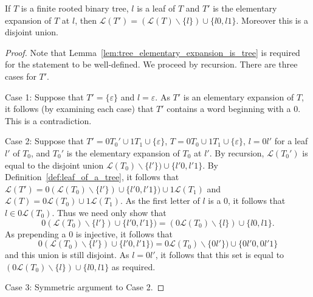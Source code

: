 \begin{lemma}\label{lem:leaves_of_elementary_expanion}
    If \(T\) is a finite rooted binary tree, \(l\) is a leaf of \(T\) and \(T'\) is the elementary expansion of \(T\) at \(l\), then \(\mathcal{L}(T')=(\mathcal{L}(T)\backslash \{l\})\cup \{l0,l1\}\). Moreover this is a disjoint union.
 \end{lemma}
 \begin{proof}
 Note that Lemma~\ref{lem:tree_elementary_expansion_is_tree} is required for the statement to be well-defined.
 We proceed by recursion.
     There are three cases for \(T'\).

     Case 1: Suppose that \(T'= \{\varepsilon\}\) and \(l=\varepsilon\). As \(T'\) is an elementary expansion of \(T\), it follows (by examining each case) that \(T'\) contains a word beginning with a \(0\). This is a contradiction.

     Case 2: Suppose that \(T'= 0T_0'\cup 1 T_1 \cup \{\varepsilon\}\), \(T=0T_0 \cup 1T_1 \cup \{\varepsilon\}\), \(l=0l'\) for a leaf \(l'\) of \(T_0\), and \(T_0'\) is the elementary expansion of \(T_0\) at \(l'\).  By recursion, \(\mathcal{L}(T_0')\) is equal to the disjoint union \(\mathcal{L}(T_0)\backslash \{l'\})\cup \{l'0,l'1\}\). By Definition~\ref{def:leaf_of_a_tree}, it follows that
     \(\mathcal{L}(T')= 0(\mathcal{L}(T_0)\backslash \{l'\})\cup \{l'0,l'1\})\cup 1\mathcal{L}(T_1)\) and \(\mathcal{L}(T)= 0\mathcal{L}(T_0)\cup 1\mathcal{L}(T_1)\).
     As the first letter of \(l\) is a \(0\), it follows that \(l\in 0\mathcal{L}(T_0)\).
     Thus we need only show that 
     \[0(\mathcal{L}(T_0)\backslash \{l'\})\cup \{l'0,l'1\})= (0\mathcal{L}(T_0)\backslash \{l\})\cup \{l0,l1\}.\]
     As prepending a \(0\) is injective, it follows that 
     \[0(\mathcal{L}(T_0)\backslash \{l'\})\cup \{l'0,l'1\})=0\mathcal{L}(T_0)\backslash \{0l'\})\cup \{0l'0,0l'1\}\]
     and this union is still disjoint.
     As \(l=0l'\), it follows that this set is equal to \((0\mathcal{L}(T_0)\backslash \{l\})\cup \{l0,l1\}\) as required.
    
 
 Case 3: Symmetric argument to Case 2.

     
 \end{proof}



